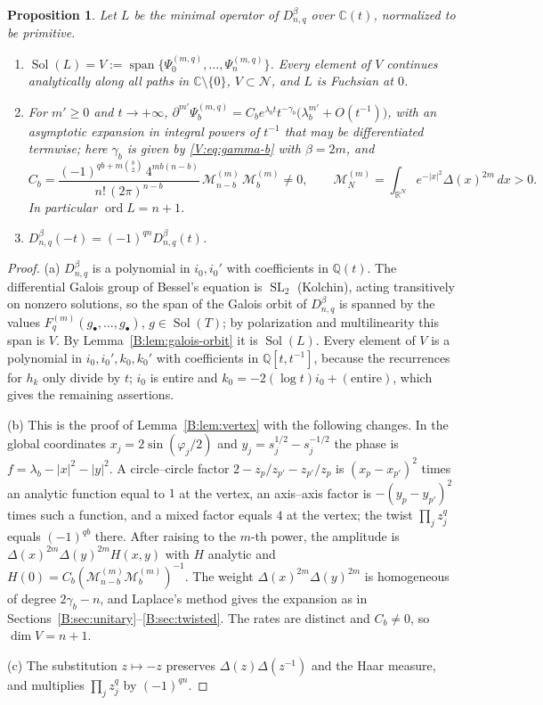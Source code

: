 \documentclass[11pt,a4paper]{article}
\newtheorem{proposition}[theorem]{Proposition}
\theoremstyle{definition}
\theoremstyle{remark}
\newcommand{\C}{\mathbb C}
\newcommand{\Q}{\mathbb Q}
\newcommand{\R}{\mathbb R}
\DeclareMathOperator{\ord}{ord}
\DeclareMathOperator{\Sol}{Sol}
\DeclareMathOperator{\SL}{SL}
\DeclareMathOperator{\spn}{span}
\numberwithin{equation}{section}
\begin{document}
\begin{proposition}\label{V:prop:even-basic}
Let $L$ be the minimal operator of $D^\beta_{n,q}$ over $\C(t)$, normalized to be primitive.
\begin{enumerate}
\item[(a)] $\Sol(L)=V:=\spn\{\Psi^{(m,q)}_0,\dots,\Psi^{(m,q)}_n\}$. Every element of $V$ continues analytically along all paths in $\C\setminus\{0\}$, $V\subset\mathcal N$, and $L$ is Fuchsian at $0$.
\item[(b)] For $m'\ge0$ and $t\to+\infty$, $\partial^{m'}\Psi^{(m,q)}_b=C_be^{\lambda_bt}t^{-\gamma_b}\bigl(\lambda_b^{m'}+O(t^{-1})\bigr)$, with an asymptotic expansion in integral powers of $t^{-1}$ that may be differentiated termwise; here $\gamma_b$ is given by \eqref{V:eq:gamma-b} with $\beta=2m$, and
\[
C_b=\frac{(-1)^{qb+m\binom b2}\,4^{mb(n-b)}}{n!\,(2\pi)^{n-b}}\,\mathcal M^{(m)}_{n-b}\,\mathcal M^{(m)}_b\ne0,\qquad\mathcal M^{(m)}_N=\int_{\R^N}e^{-|x|^2}\Delta(x)^{2m}\,dx>0 .
\]
In particular $\ord L=n+1$.
\item[(c)] $D^\beta_{n,q}(-t)=(-1)^{qn}D^\beta_{n,q}(t)$.
\end{enumerate}
\end{proposition}

\begin{proof}
(a) $D^\beta_{n,q}$ is a polynomial in $i_0,i_0'$ with coefficients in $\Q(t)$. The differential Galois group of Bessel's equation is $\SL_2$ (Kolchin), acting transitively on nonzero solutions, so the span of the Galois orbit of $D^\beta_{n,q}$ is spanned by the values $F^{(m)}_q(g_\bullet,\dots,g_\bullet)$, $g\in\Sol(T)$; by polarization and multilinearity this span is $V$. By Lemma~\ref{B:lem:galois-orbit} it is $\Sol(L)$. Every element of $V$ is a polynomial in $i_0,i_0',k_0,k_0'$ with coefficients in $\Q[t,t^{-1}]$, because the recurrences for $h_k$ only divide by $t$; $i_0$ is entire and $k_0=-2(\log t)i_0+(\text{entire})$, which gives the remaining assertions.

(b) This is the proof of Lemma~\ref{B:lem:vertex} with the following changes. In the global coordinates $x_j=2\sin(\varphi_j/2)$ and $y_j=s_j^{1/2}-s_j^{-1/2}$ the phase is $f=\lambda_b-|x|^2-|y|^2$. A circle--circle factor $2-z_p/z_{p'}-z_{p'}/z_p$ is $(x_p-x_{p'})^2$ times an analytic function equal to $1$ at the vertex, an axis--axis factor is $-(y_p-y_{p'})^2$ times such a function, and a mixed factor equals $4$ at the vertex; the twist $\prod_jz_j^q$ equals $(-1)^{qb}$ there. After raising to the $m$-th power, the amplitude is $\Delta(x)^{2m}\Delta(y)^{2m}H(x,y)$ with $H$ analytic and $H(0)=C_b(\mathcal M^{(m)}_{n-b}\mathcal M^{(m)}_b)^{-1}$. The weight $\Delta(x)^{2m}\Delta(y)^{2m}$ is homogeneous of degree $2\gamma_b-n$, and Laplace's method gives the expansion as in Sections~\ref{B:sec:unitary}--\ref{B:sec:twisted}. The rates are distinct and $C_b\ne0$, so $\dim V=n+1$.

(c) The substitution $z\mapsto-z$ preserves $\Delta(z)\Delta(z^{-1})$ and the Haar measure, and multiplies $\prod_jz_j^q$ by $(-1)^{qn}$.
\end{proof}
\end{document}
